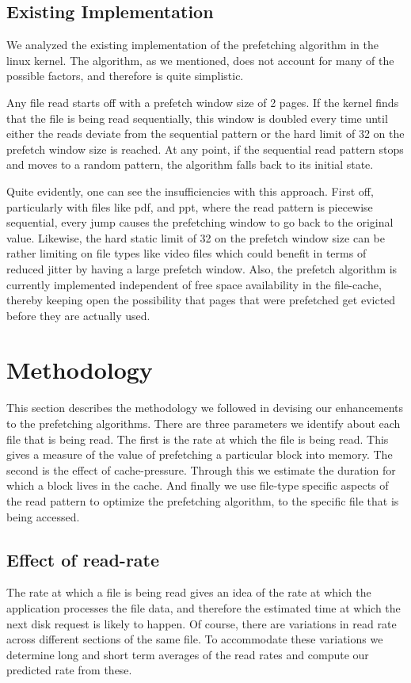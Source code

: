 \documentclass[twocolumn,10pt]{article}
\begin{document}
\subsection{Existing Implementation}

We analyzed the existing implementation of the prefetching algorithm in
the linux kernel. The algorithm, as we mentioned, does not account for
many of the possible factors, and therefore is quite simplistic.

Any file read starts off with a prefetch window size of 2 pages. If the kernel finds that
the file is being read sequentially, this window is doubled every time until either
the reads deviate from the sequential pattern or the hard limit of 32 on the prefetch
window size is reached. At any point, if the sequential read pattern stops and moves to a 
random pattern, the algorithm falls back to its initial state.

Quite evidently, one can see the insufficiencies with this approach. First off, particularly
with files like pdf, and ppt, where the read pattern is piecewise sequential, every 
jump causes the prefetching window to go back to the original value. Likewise, the 
hard static limit of 32 on the prefetch window size can be rather limiting on 
file types like video files which could benefit in terms of reduced jitter by 
having a large prefetch window. Also, the prefetch algorithm is currently implemented
independent of free space availability in the file-cache, thereby keeping open the
possibility that pages that were prefetched get evicted before they are actually used.

\section{Methodology}

This section describes the methodology we followed in devising our enhancements to
the prefetching algorithms. There are three parameters we identify about each
file that is being read. The first is the rate at which the file is being read.
This gives a measure of the value of prefetching a particular block into memory.
The second is the effect of cache-pressure. Through this we estimate the duration
for which a block lives in the cache. And finally we use file-type specific aspects
of the read pattern to optimize the prefetching algorithm, to the specific file
that is being accessed.

\subsection{Effect of read-rate}
The rate at which a file is being read gives an idea of the rate at which the 
application processes the file data, and therefore the estimated time at which
the next disk request is likely to happen. Of course, there are variations in 
read rate across different sections of the same file. To accommodate these variations
we determine long and short term averages of the read rates and compute our predicted
rate from these.
\end{document}
